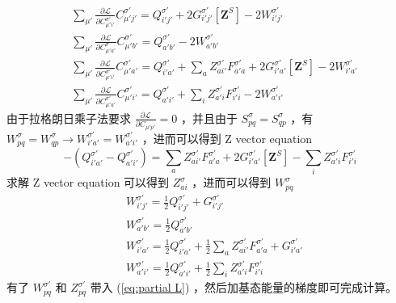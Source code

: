 \documentclass[11pt]{ctexart}
\numberwithin{equation}{section}
\begin{document}
\begin{equation}
    \begin{aligned}
        & \sum_{\mu'}\frac{\partial\mathcal{L}}{\partial C_{\mu' i'}^{\sigma'}}C_{\mu' j'}^{\sigma'}
        = Q_{i' j'}^{\sigma'}
        + 2G_{i' j'}^{\sigma'}[\mathbf{Z}^S]
        - 2W_{i' j'}^{\sigma'}\\
        & \sum_{\mu'}\frac{\partial\mathcal{L}}{\partial C_{\mu' a'}^{\sigma}}C_{\mu' b'}^{\sigma'}
        = Q_{a' b'}^{\sigma'} 
        - 2W_{a' b'}^{\sigma'}\\
        & \sum_{\mu'}\frac{\partial\mathcal{L}}{\partial C_{\mu' i'}^{\sigma'}}C_{\mu' a'}^{\sigma'}
        = Q_{i' a'}^{\sigma'}
        + \sum_{a}Z_{a i'}^{\sigma'}F_{a' a}^{\sigma'}
        + 2G_{i' a'}^{\sigma'}[\mathbf{Z}^S]
        - 2W_{i' a'}^{\sigma'}\\
        & \sum_{\mu'}\frac{\partial\mathcal{L}}{\partial C_{\mu' a'}^{\sigma'}}C_{\mu' i'}^{\sigma'}
        = Q_{a' i'}^{\sigma'}
        + \sum_{i}Z_{a' i}^{\sigma'}F_{i' i}^{\sigma'}
        - 2W_{a' i'}^{\sigma'}
    \end{aligned}
\end{equation}
由于拉格朗日乘子法要求 $\frac{\partial\mathcal{L}}{\partial C_{\mu'p'}}=0$ ，并且由于 $S_{pq}^{\sigma}=S_{qp}^{\sigma}$ ，有 $W_{pq}^{\sigma}=W_{qp}^{\sigma}\rightarrow W_{i'a'}^{\sigma'}=W_{a'i'}^{\sigma'}$ ，进而可以得到 Z vector equation
\begin{equation}
    - (Q_{i'a'}^{\sigma'} - Q_{a'i'}^{\sigma'})
    = \sum_{a}Z_{ai'}^{\sigma'}F_{a'a}^{\sigma'} 
    + 2G_{i'a'}^{\sigma'}[\mathbf{Z}^S]
    - \sum_{i}Z_{a'i}^{\sigma'}F_{i'i}^{\sigma'}
\end{equation}
求解 Z vector equation 可以得到 $Z_{ai}^{\sigma}$ ，进而可以得到 $W_{pq}^{\sigma}$
\begin{equation}
    \begin{aligned}
        & W_{i'j'}^{\sigma'} = \frac{1}{2}Q_{i'j'}^{\sigma'} + G_{i'j'}^{\sigma'}\\
        & W_{a'b'}^{\sigma'} = \frac{1}{2}Q_{a'b'}^{\sigma'}\\
        & W_{i'a'}^{\sigma'} = \frac{1}{2}Q_{i'a'}^{\sigma'} + \frac{1}{2}\sum_{a}Z_{ai'}^{\sigma'}F_{a'a}^{\sigma'} + G_{i'a'}^{\sigma'}\\
        & W_{a'i'}^{\sigma'} = \frac{1}{2}Q_{a'i'}^{\sigma'} + \frac{1}{2}\sum_{i}Z_{a'i}^{\sigma'}F_{i'i}^{\sigma'}
    \end{aligned}
\end{equation}
有了 $W_{pq}^{\sigma'}$ 和 $Z_{pq}^{\sigma'}$ 带入 (\ref{eq:partial L}) ，然后加基态能量的梯度即可完成计算。
\end{document}
